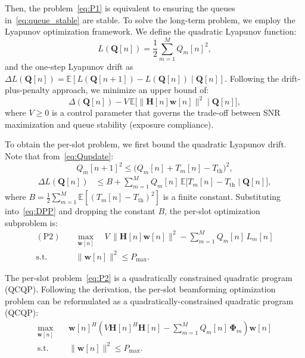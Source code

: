 \documentclass[journal]{IEEEtran}
\begin{document}
Then, the problem~\eqref{eq:P1} is equivalent to ensuring the queues in~\eqref{eq:queue_stable} are stable. To solve the long-term problem, we employ the Lyapunov optimization framework. We define the quadratic Lyapunov function:
\begin{equation}
    L(\mathbf{Q}[n]) = \frac{1}{2}\sum_{m=1}^{M} Q_m[n]^2,
    \label{eq:Lyap}
\end{equation}
and the one-step Lyapunov drift as $\Delta L(\mathbf{Q}[n]) = \mathbb{E}[L(\mathbf{Q}[n+1]) - L(\mathbf{Q}[n]) \mid \mathbf{Q}[n]]$. Following the drift-plus-penalty approach, we minimize an upper bound of:
\begin{equation}
    \Delta(\mathbf{Q}[n]) - V\,\mathbb{E}\bigl[\|\mathbf{H}[n]\mathbf{w}[n]\|^2 \mid \mathbf{Q}[n]\bigr],
    \label{eq:DPP}
\end{equation}
where $V \geq 0$ is a control parameter that governs the trade-off between SNR maximization and queue stability (exposure compliance).

To obtain the per-slot problem, we first bound the quadratic Lyapunov drift. Note that from~\eqref{eq:Qupdate}:
\begin{equation}
    Q_m[n+1]^2 \leq \bigl(Q_m[n] + T_m[n] - T_{\text{th}}\bigr)^2,
\end{equation}
\begin{align}
    \Delta L(\mathbf{Q}[n]) &\leq B + \sum_{m=1}^{M} Q_m[n]\,\mathbb{E}\bigl[T_m[n] - T_{\text{th}} \mid \mathbf{Q}[n]\bigr],
    \label{eq:drift_bound}
\end{align}
where $B = \frac{1}{2}\sum_{m=1}^{M}\mathbb{E}[(T_m[n] - T_{\text{th}})^2]$ is a finite constant. Substituting into~\eqref{eq:DPP} and dropping the constant $B$, the per-slot optimization subproblem is:
\begin{equation}
\begin{aligned}
    (\text{P2}) \quad & \max_{\mathbf{w}[n]} \quad V\,\|\mathbf{H}[n]\mathbf{w}[n]\|^2
    - \sum_{m=1}^{M} Q_m[n]\,L_m[n] \\
    \text{s.t.} \quad & \|\mathbf{w}[n]\|^2 \leq P_{\max}.
\end{aligned}
\label{eq:P2}
\end{equation}

The per-slot problem~\eqref{eq:P2} is a quadratically constrained quadratic program (QCQP). Following the derivation, the per-slot beamforming optimization problem can be reformulated as a quadratically-constrained quadratic program (QCQP):
\begin{equation}
\begin{aligned}
    \max_{\mathbf{w}[n]} \quad & \mathbf{w}[n]^H\!\left(V\mathbf{H}[n]^H\mathbf{H}[n] - \sum_{m=1}^{M} Q_m[n]\,\boldsymbol{\Phi}_m\right)\!\mathbf{w}[n]\\
    \text{s.t.} \quad & \|\mathbf{w}[n]\|^2 \leq P_{\max}.
\end{aligned}
\label{eq:P3}
\end{equation}
\end{document}
